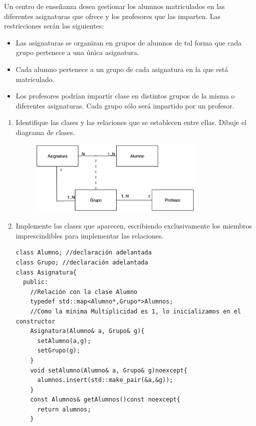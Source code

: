  Un centro de enseñanza desea gestionar los alumnos matriculados en las diferentes asignaturas que ofrece y los profesores que las imparten. Las restricciones serán las siguientes:

\begin{itemize}
  \item Las asignaturas se organizan en grupos de alumnos de tal forma que cada grupo pertenece a una única asignatura.
  \item Cada alumno pertenece a un grupo de cada asignatura en la que está matriculado.
  \item Los profesores podrían impartir clase en distintos grupos de la misma o diferentes asignaturas. Cada grupo sólo será impartido por un profesor.
\end{itemize}
\begin{enumerate}[label = \alph*)]
  \item Identifique las clases y las relaciones que se establecen entre ellas. Dibuje el diagrama de clases.
\begin{figure}[h]
  \begin{center}
    \includegraphics[width=0.8\textwidth]{assets/Junio2008_1.png.jpeg}
  \end{center}
\end{figure}
  \item Implemente las clases que aparecen, escribiendo exclusivamente los miembros imprescindibles para implementar las relaciones.
\begin{verbatim}
class Alumno; //declaración adelantada
class Grupo; //declaración adelantada
class Asignatura{
  public:
    //Relación con la clase Alumno
    typedef std::map<Alumno*,Grupo*>Alumnos;
    //Como la minima Multiplicidad es 1, lo inicializamos en el constructor
    Asignatura(Alumno& a, Grupo& g){
      setAlumno(a,g);
      setGrupo(g);
    }
    void setAlumno(Alumno& a, Grupo& g)noexcept{
      alumnos.insert(std::make_pair(&a,&g));
    }
    const Alumnos& getAlumnos()const noexcept{
      return alumnos;
    }



\end{verbatim}
\end{enumerate}
